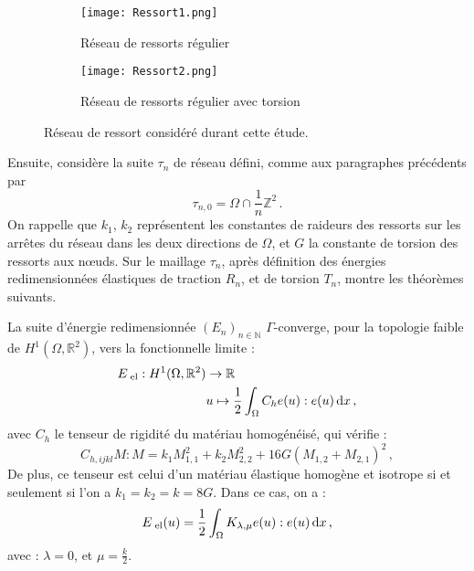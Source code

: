 \begin{figure}[!ht]
    \centering
    \begin{subfigure}[b]{0.3\textwidth}
        \centering
        \texttt{[image: Ressort1.png]} 
        \caption{Réseau de ressorts régulier}
        \label{fig:Ressort1}
    \end{subfigure}
    \hspace*{30pt}
    \begin{subfigure}[b]{0.3\textwidth}
        \centering
        \texttt{[image: Ressort2.png]} 
        \caption{Réseau de ressorts régulier avec torsion}
        \label{fig:Ressort2}
    \end{subfigure}
       \caption{Réseau de ressort considéré durant cette étude.}
       \label{fig:Reseau}
\end{figure}

Ensuite, \citeauthor{balasoiu2020halthesis} considère la suite $\tau_n$ de réseau défini, comme aux paragraphes précédents par 
$$
\tau_{n,0} = \Omega \cap \frac{1}{n} \mathbb{Z}^2 \,.
$$
On rappelle que $k_1$, $k_2$ représentent les constantes de raideurs des ressorts sur les arrêtes du réseau dans les deux directions de $\Omega$, et $G$ la constante de torsion des ressorts aux n\oe{}uds. Sur le maillage $\tau_n$, après définition des énergies redimensionnées élastiques de traction $R_n$, et de torsion $T_n$, \parencite[p.91]{balasoiu2020halthesis} montre les théorèmes suivants. 

\begin{theorem}
    \label{theo:gammaconv}
    La suite d'énergie redimensionnée $(E_n)_{n\in\mathbb{N}}$ $\Gamma$-converge, pour la topologie faible de $H^1(\Omega, \mathbb{R}^2)$, vers la fonctionnelle limite :
    \begin{align*}
        \eel : H^1(\Omega, \mathbb{R}^2) &\rightarrow \mathbb{R} \\
        &u \mapsto \frac{1}{2} \int_{\Omega} C_h e(u):e(u) \diff x \,,
    \end{align*}
    avec $C_h$ le tenseur de rigidité du matériau homogénéisé, qui vérifie :
    $$
    C_{h,ijkl}M:M = k_1 M^2_{1,1} + k_2 M^2_{2,2} + 16G(M_{1,2} + M_{2,1})^2 \,,
    $$
    De plus, ce tenseur est celui d’un matériau élastique homogène et isotrope si et seulement si l’on a $k_1 = k_2 = k = 8G$. Dans ce cas, on a :
    $$
    \eel(u) = \frac{1}{2} \int_{\Omega} K_{\lambda, \mu}e(u) : e(u) \diff x \,,
    $$
    avec :
    $\lambda = 0$, et $\mu = \frac{k}{2}$.
\end{theorem}


